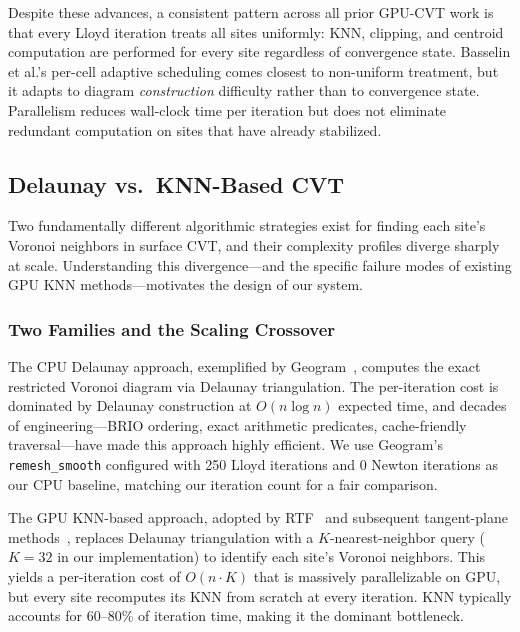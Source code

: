 Despite these advances, a consistent pattern across all prior GPU-CVT work is that every Lloyd iteration treats all sites uniformly: KNN, clipping, and centroid computation are performed for every site regardless of convergence state. Basselin et al.'s per-cell adaptive scheduling comes closest to non-uniform treatment, but it adapts to diagram \emph{construction} difficulty rather than to convergence state. Parallelism reduces wall-clock time per iteration but does not eliminate redundant computation on sites that have already stabilized.

\subsection{Delaunay vs.\ KNN-Based CVT}

Two fundamentally different algorithmic strategies exist for finding each site's Voronoi neighbors in surface CVT, and their complexity profiles diverge sharply at scale. Understanding this divergence---and the specific failure modes of existing GPU KNN methods---motivates the design of our system.

\subsubsection{Two Families and the Scaling Crossover}

The CPU Delaunay approach, exemplified by Geogram~\cite{levy2010lp, yan2009rvd, yan2014clipped}, computes the exact restricted Voronoi diagram via Delaunay triangulation. The per-iteration cost is dominated by Delaunay construction at $O(n \log n)$ expected time, and decades of engineering---BRIO ordering, exact arithmetic predicates, cache-friendly traversal---have made this approach highly efficient. We use Geogram's \texttt{remesh\_smooth} configured with 250 Lloyd iterations and 0 Newton iterations as our CPU baseline, matching our iteration count for a fair comparison.

The GPU KNN-based approach, adopted by RTF~\cite{yao2023rtf} and subsequent tangent-plane methods~\cite{fei2025adaptive}, replaces Delaunay triangulation with a $K$-nearest-neighbor query ($K=32$ in our implementation) to identify each site's Voronoi neighbors. This yields a per-iteration cost of $O(n \cdot K)$ that is massively parallelizable on GPU, but every site recomputes its KNN from scratch at every iteration. KNN typically accounts for 60--80\% of iteration time, making it the dominant bottleneck.

